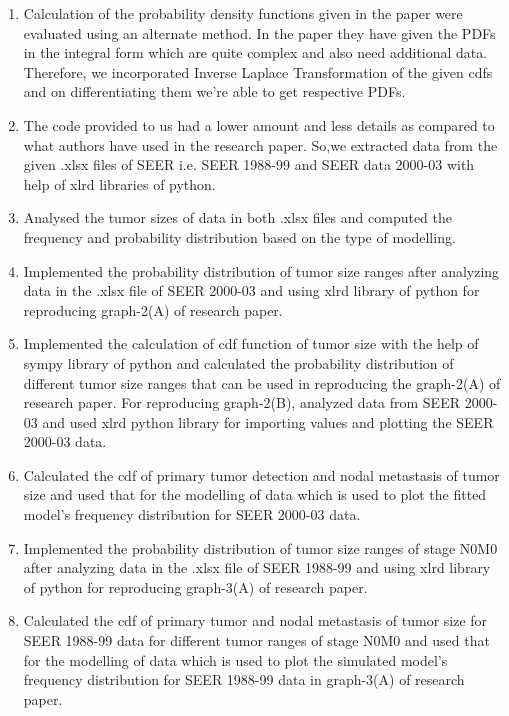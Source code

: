 \documentclass{article}
\begin{document}
	\begin{enumerate}
		\item Calculation of the probability density functions given in the paper were evaluated using an alternate method. In the paper they have given the PDFs in the integral form which are quite complex and also need additional data. Therefore, we incorporated Inverse Laplace Transformation of the given cdfs and on differentiating them we’re able to get respective PDFs.
		
		\item The code provided to us had a lower amount and less details as compared to what authors have used in the research paper. So,we extracted data from the given .xlsx files of SEER i.e. SEER 1988-99 and SEER data 2000-03 with help of xlrd libraries of python.
		\item Analysed the tumor sizes of data in both .xlsx files and computed the frequency and probability distribution based on the type of modelling.
		\item Implemented the probability distribution of tumor size ranges after analyzing data in the .xlsx file of SEER 2000-03 and using xlrd library of python for reproducing graph-2(A) of research paper.
		\item Implemented the calculation of cdf function of tumor size with the help of sympy library of python and calculated the probability distribution of different tumor size ranges that can be used in reproducing the graph-2(A) of research paper.
		For reproducing graph-2(B), analyzed data from SEER 2000-03 and used xlrd python library for importing values and plotting the SEER 2000-03 data.
		
		\item Calculated the cdf of primary tumor detection and nodal metastasis of tumor size and used that for the modelling of data which is used to plot the fitted model’s frequency distribution for SEER 2000-03 data.
		
		\item Implemented the probability distribution of tumor size ranges of stage N0M0 after analyzing data in the .xlsx file of SEER 1988-99 and using xlrd library of python for reproducing graph-3(A) of research paper.
		
	   	\item Calculated the cdf of primary tumor and nodal metastasis of tumor size for SEER 1988-99 data for different tumor ranges of stage N0M0 and used that for the modelling of data which is used to plot the simulated model’s frequency distribution for SEER 1988-99 data in graph-3(A) of research paper.
		

\end{enumerate}
\end{document}
